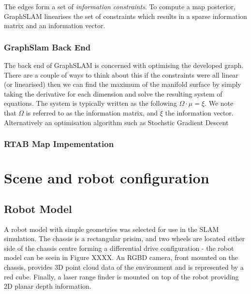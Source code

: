 \documentclass[a4paper]{article}
\begin{document}
The edges form a set of \textit{information constraints}. To compute a map posterior, GraphSLAM linearises the set of constraints which results in a sparse information matrix and an information vector. 

\subsubsection{GraphSlam Back End}
The back end of GraphSLAM is concerned with optimising the developed graph. There are a couple of ways to think about this if the constraints were all linear (or linearised) then we can find the maximum of the manifold surface by simply taking the derivative for each dimension and solve the resulting system of equations. The system is typically written as the following $\Omega \cdot \mu = \xi$. We note that $\Omega$ is referred to as the information matrix, and $\xi$ the information vector. Alternatively an optimisation algorithm such as Stochstic Gradient Descent 


\subsubsection{RTAB Map Impementation}


\section{Scene and robot configuration}
\subsection{Robot Model}
A robot model with simple geometries was selected for use in the SLAM simulation. The chassis is a rectangular prisim, and two wheels are located either side of the chassis centre forming a differential drive configuration - the robot model can be seein in Figure XXXX. An RGBD camera, front mounted on the chassis, provides 3D point cloud data of the environment and is represented by a red cube. Finally, a laser range finder is mounted on top of the robot providing 2D planar depth information.\\
\end{document}
